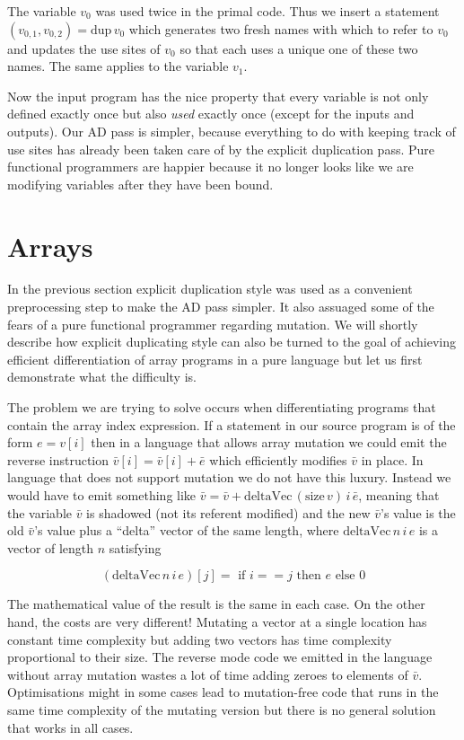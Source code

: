 \documentclass[12pt]{article}
\begin{document}
The variable $v_0$ was used twice in the primal code.  Thus we insert
a statement $(v_{0,1}, v_{0,2}) = \mathrm{dup} \, v_0$ which generates
two fresh names with which to refer to $v_0$ and updates the use sites
of $v_0$ so that each uses a unique one of these two names.  The same
applies to the variable $v_1$.

Now the input program has the nice property that every variable is not
only defined exactly once but also \emph{used} exactly once (except
for the inputs and outputs).  Our AD pass is simpler, because
everything to do with keeping track of use sites has already been
taken care of by the explicit duplication pass.  Pure functional
programmers are happier because it no longer looks like we are
modifying variables after they have been bound.

\section{Arrays}

In the previous section explicit duplication style was used as a
convenient preprocessing step to make the AD pass simpler.  It also
assuaged some of the fears of a pure functional programmer regarding
mutation.  We will shortly describe how explicit duplicating style can
also be turned to the goal of achieving efficient differentiation of
array programs in a pure language but let us first demonstrate what
the difficulty is.

The problem we are trying to solve occurs when differentiating
programs that contain the array index expression.  If a statement in
our source program is of the form $e = v[i]$ then in a language that
allows array mutation we could emit the reverse instruction
$\bar{v}[i] = \bar{v}[i] + \bar{e}$ which efficiently modifies
$\bar{v}$ in place.  In language that does not support mutation we do
not have this luxury.  Instead we would have to emit something like
$\bar{v} = \bar{v} + \textrm{deltaVec} \, (\textrm{size} \, v) \, i \,
\bar{e}$, meaning that the variable $\bar{v}$ is shadowed (not its
referent modified) and the new $\bar{v}$'s value is the old
$\bar{v}$'s value plus a ``delta'' vector of the same length, where
$\textrm{deltaVec} \, n \, i \, e$ is a vector of length $n$ satisfying

\[
(\textrm{deltaVec} \, n \, i \, e)[j]
= \textrm{ if } i == j \textrm{ then } e  \textrm{ else } 0
\]

The mathematical value of the result is the same in each case.  On the
other hand, the costs are very different!  Mutating a vector at a
single location has constant time complexity but adding two vectors
has time complexity proportional to their size.  The reverse mode code
we emitted in the language without array mutation wastes a lot of time
adding zeroes to elements of $\bar{v}$.  Optimisations might in some
cases lead to mutation-free code that runs in the same time complexity
of the mutating version but there is no general solution that works in
all cases.
\end{document}

